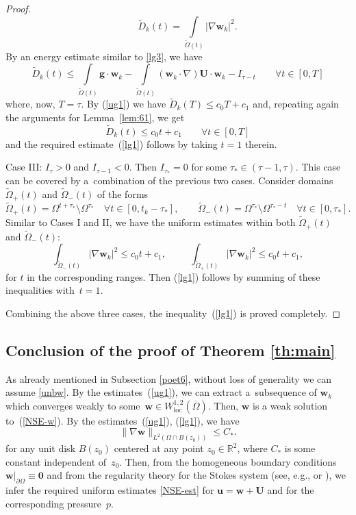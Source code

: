 \documentclass[11pt]{article}
\numberwithin{equation}{section}
\numberwithin{figure}{section}
\newcommand{\R}{\mathbb{R}}
\def\loc{{\mathrm{loc}}}
\def\R{{\mathbb R}}
\def\ue{{\mathbf u}}
\def\0{{\mathbf 0}}
\def\WO{{\widetilde\Omega}}
\def\WD{{\widetilde D}}
\def\we{{\mathbf w}}
\begin{document}
\begin{proof}
$$\qquad\WD_k(t)=\int\limits_{\WO(t)}|\nabla\we_k|^2.$$
	By an energy estimate similar to \eqref{lg3}, we have
	\begin{equation}\label{lg5}\WD_k(t)\le \int\limits_{\WO(t)}\mathbf{g}\cdot\we_k-\int\limits_{\WO(t)}(\mathbf{w}_k \cdot \nabla) \mathbf{U}\cdot\we_k-I_{\tau-t}\qquad\forall t\in [0,T]
\end{equation}
where, now, $T=\tau$. By (\ref{ug1}) we have $\WD_k(T)\le c_0 T+c_1$ and, repeating again the arguments for Lemma~\ref{lem:61},
we get
$$\WD_k(t)\le c_0 t +c_1\qquad\forall  t\in [0, T]$$
and the required estimate~(\ref{lg1}) follows by taking $t=1$ therein.\par
	{\sc Case III}: $I_{\tau}>0$ and $I_{\tau-1}<0$. Then  $I_{\tau_*}=0$ for some $\tau_*\in (\tau-1,\tau)$. This case can be covered by a~combination  of the  previous two cases. Consider domains $\WO_+(t)$ and $\WO_-(t)$ of the forms
$$\WO_+(t)=\Omega^{t+\tau_*}\setminus\Omega^{\tau_*}\quad\forall t\in [0, t_k-\tau_*],\qquad
\WO_-(t)=\Omega^{\tau_*}\setminus\Omega^{\tau_*-t}\quad\forall t\in [0, \tau_*].$$
	Similar to Cases I and II, we have the uniform estimates within both $\WO_+(t)$ and $\WO_-(t)$:
	\begin{equation}
		\int_{\WO_-(t)} |\nabla \we_k|^2\le c_0 t+ c_1, \qquad \ \ \int_{\WO_+(t)} |\nabla \we_k|^2 \le c_0 t+ c_1,
	\end{equation}
	for $t$ in the corresponding ranges. Then (\ref{lg1}) follows by summing of these inequalities with~$t= 1$.\par	
Combining the above three cases, the inequality~(\ref{lg1}) is proved completely.\end{proof}

\subsection{Conclusion of the proof of Theorem \ref{th:main}} \label{conclusionproof}

As already mentioned in Subsection \ref{poet6}, without loss of generality we can assume \eqref{unbw}. By the estimates~(\ref{ug1}), we can extract a~subsequence of $\we_k$ which converges weakly to some~$\we\in W^{1,2}_\loc(\overline\Omega)$. Then, $\we$ is a weak solution to~(\ref{NSE-w}).  By the estimates~(\ref{ug1}), (\ref{lg1}), we have
\begin{equation}  \label{NSE-les}
	\|\nabla\we\|_{L^2(\Omega\cap B(z_0))}\le C_*.
\end{equation}
for any unit disk $B(z_0)$ centered at any point $z_0\in\R^2$, where $C_*$ is some constant independent of~$z_0$.
Then, from the homogeneous boundary conditions~$\we|_{\partial\Omega}\equiv\0$ and from the regularity theory for the Stokes system (see, e.g., \cite[Section~IV.6]{galdi2011introduction} or \cite[Section~2.4.2]{korobkov2024steady}),
we infer the required uniform estimates \eqref{NSE-est} for $\ue=\we+\mathbf{U}$ and for the corresponding pressure~$p$.
\end{document}
